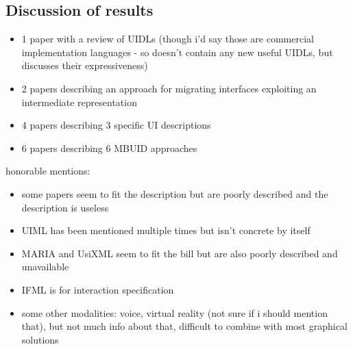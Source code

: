 \subsection{Discussion of results}\label{subsec:discussion-of-results}

\begin{itemize}
    \item 1 paper with a review of UIDLs (though i'd say those are commercial implementation languages - so doesn't contain any new useful UIDLs, but discusses their expressiveness)
    \item 2 papers describing an approach for migrating interfaces exploiting an intermediate representation
    \item 4 papers describing 3 specific UI descriptions
    \item 6 papers describing 6 MBUID approaches
\end{itemize}

honorable mentions:
\begin{itemize}
    \item some papers seem to fit the description but are poorly described and the description is useless
    \item UIML has been mentioned multiple times but isn't concrete by itself
    \item MARIA and UsiXML seem to fit the bill but are also poorly described and unavailable
    \item IFML is for interaction specification
    \item some other modalities: voice, virtual reality (not sure if i should mention that), but not much info about that, difficult to combine with most graphical solutions
\end{itemize}
